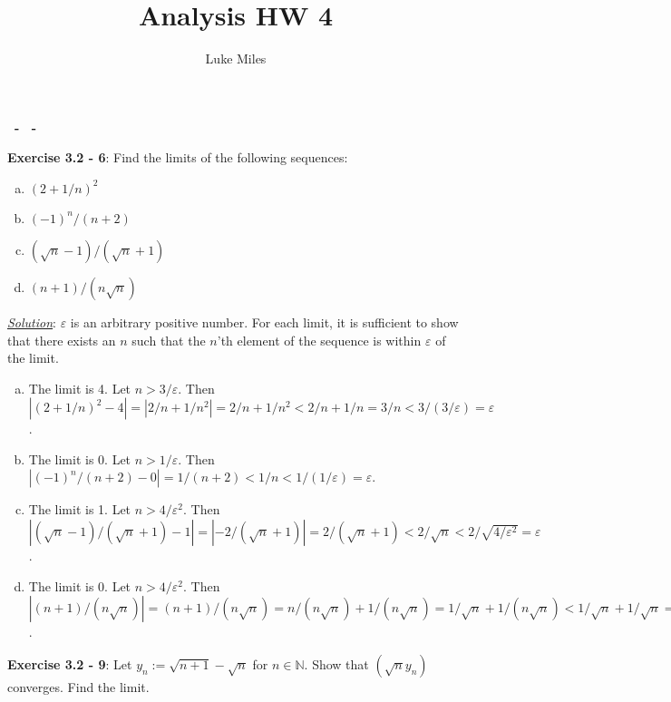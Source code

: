 \documentclass{article}
\title{Analysis HW 4}
\author{Luke Miles}
\begin{document}
\raggedright

\makeatletter
\textbf{\@title\ - \@author\ - \@date}
\makeatother

\hrulefill

\textbf{Exercise 3.2 - 6}: Find the limits of the following sequences:

\begin{enumerate}[(a)]
  \item $ (2+1/n)^2$
  \item $ (-1)^n / (n + 2)$
  \item $ (\sqrt{n} - 1) / (\sqrt{n} + 1)$
  \item $ (n+1)/(n\sqrt{n})$
\end{enumerate}

\underline{\textit{Solution}}:
 $\varepsilon$ is an arbitrary positive number. For each limit, it is
sufficient to show that there exists an $n$ such that the $n$'th element
of the sequence is within $\varepsilon$ of the limit. 

\begin{enumerate}[(a)]

  \item The limit is 4. Let $n > 3 / \varepsilon$.  Then
    $
    \left| (2 + 1/n) ^2 - 4 \right|
    = \left| 2/n + 1/n^2 \right|
    = 2/n + 1/n^2
    < 2/n + 1/n
    = 3/n
    < 3 / (3 / \varepsilon)
    = \varepsilon
    $.

  \item The limit is 0. Let $n > 1 / \varepsilon$. Then
    $
    \left| (-1)^n/(n+2) - 0 \right|
    = 1/(n+2)
    < 1/n
    < 1/(1/\varepsilon)
    = \varepsilon
    $.

  \item The limit is 1. Let $n > 4 / \varepsilon ^ 2$. Then
    $
    \left| (\sqrt{n}-1) / (\sqrt{n} + 1) - 1 \right|
    = \left| -2/(\sqrt{n} + 1) \right|
    = 2 / (\sqrt{n} + 1)
    < 2/\sqrt{n}
    < 2 / \sqrt{4 / \varepsilon ^ 2}
    = \varepsilon
    $.

  \item The limit is 0. Let $n > 4 / \varepsilon ^ 2$. Then
    $
    | (n + 1) / (n \sqrt{n}) |
    = (n + 1) / (n \sqrt{n})
    = n / (n \sqrt{n}) + 1 / (n \sqrt{n})
    = 1 / \sqrt{n} + 1 / (n \sqrt{n})
    < 1 / \sqrt{n} + 1 / \sqrt{n}
    = 2 / \sqrt{n}
    < 2 / \sqrt{4 / \varepsilon ^ 2}
    = \varepsilon
    $.
\end{enumerate}

\hrulefill

\textbf{Exercise 3.2 - 9}: Let $y_n := \sqrt{n + 1} - \sqrt{n}$ for $n \in
\mathbb{N}$. Show that $(\sqrt{n}y_n)$ converges. Find the limit.
\end{document}
